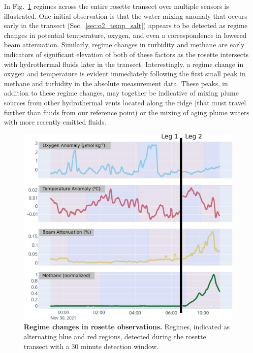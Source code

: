 In Fig.~\ref{fig:rosette_regimes} regimes across the entire rosette transect over multiple sensors is illustrated. One initial observation is that the water-mixing anomaly that occurs early in the transect (Sec.~\ref{sec:o2_temp_salt}) appears to be detected as regime changes in potential temperature, oxygen, and even a correspondence in lowered beam attenuation. Similarly, regime changes in turbidity and methane are early indicators of significant elevation of both of these factors as the rosette intersects with hydrothermal fluids later in the transect. Interestingly, a regime change in oxygen and temperature is evident immediately following the first small peak in methane and turbidity in the absolute measurement data. These peaks, in addition to these regime changes, may together be indicative of mixing plume sources from other hydrothermal vents located along the ridge (that must travel further than fluids from our reference point) or the mixing of aging plume waters with more recently emitted fluids.

\begin{figure}[h!]
    \centering
    \includegraphics[width=1\columnwidth]{figures/chap3_rosette_regimes.jpg}
    \caption[Regime changes in rosette observations]{\textbf{Regime changes in rosette observations.} Regimes, indicated as alternating blue and red regions, detected during the rosette transect with a 30 minute detection window.}
    \label{fig:rosette_regimes}
\end{figure}


